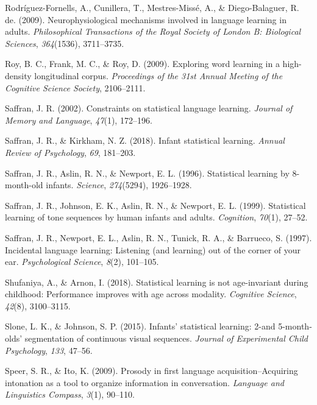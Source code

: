 \documentclass[man,mask,floatsintext]{apa6}
\begin{document}
\hypertarget{ref-rodriguez2009neurophysiological}{}
Rodríguez-Fornells, A., Cunillera, T., Mestres-Missé, A., \&
Diego-Balaguer, R. de. (2009). Neurophysiological mechanisms involved in
language learning in adults. \emph{Philosophical Transactions of the
Royal Society of London B: Biological Sciences}, \emph{364}(1536),
3711--3735.

\hypertarget{ref-roy2009exploring}{}
Roy, B. C., Frank, M. C., \& Roy, D. (2009). Exploring word learning in
a high-density longitudinal corpus. \emph{Proceedings of the 31st Annual
Meeting of the Cognitive Science Society}, 2106--2111.

\hypertarget{ref-saffran2002constraints}{}
Saffran, J. R. (2002). Constraints on statistical language learning.
\emph{Journal of Memory and Language}, \emph{47}(1), 172--196.

\hypertarget{ref-saffran2018infant}{}
Saffran, J. R., \& Kirkham, N. Z. (2018). Infant statistical learning.
\emph{Annual Review of Psychology}, \emph{69}, 181--203.

\hypertarget{ref-saffran1996statistical}{}
Saffran, J. R., Aslin, R. N., \& Newport, E. L. (1996). Statistical
learning by 8-month-old infants. \emph{Science}, \emph{274}(5294),
1926--1928.

\hypertarget{ref-saffran1999statistical}{}
Saffran, J. R., Johnson, E. K., Aslin, R. N., \& Newport, E. L. (1999).
Statistical learning of tone sequences by human infants and adults.
\emph{Cognition}, \emph{70}(1), 27--52.

\hypertarget{ref-saffran1997incidental}{}
Saffran, J. R., Newport, E. L., Aslin, R. N., Tunick, R. A., \&
Barrueco, S. (1997). Incidental language learning: Listening (and
learning) out of the corner of your ear. \emph{Psychological Science},
\emph{8}(2), 101--105.

\hypertarget{ref-shufaniya2018statistical}{}
Shufaniya, A., \& Arnon, I. (2018). Statistical learning is not
age-invariant during childhood: Performance improves with age across
modality. \emph{Cognitive Science}, \emph{42}(8), 3100--3115.

\hypertarget{ref-slone2015infants}{}
Slone, L. K., \& Johnson, S. P. (2015). Infants' statistical learning:
2-and 5-month-olds' segmentation of continuous visual sequences.
\emph{Journal of Experimental Child Psychology}, \emph{133}, 47--56.

\hypertarget{ref-speer2009prosody}{}
Speer, S. R., \& Ito, K. (2009). Prosody in first language
acquisition--Acquiring intonation as a tool to organize information in
conversation. \emph{Language and Linguistics Compass}, \emph{3}(1),
90--110.
\end{document}

